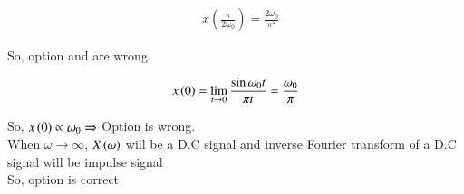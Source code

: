 \documentclass[beamer]{IEEEtran}
\theoremstyle{remark}
\begin{document}
\begin{align}
& x\left(\frac{\pi}{2 \omega_0}\right) =\frac{2 \omega_0}{\pi^2}
\end{align}

So, option  and  are wrong.

\begin{align}
x\left(0\right)=\lim_{t\to 0}\frac{\sin \omega_0 t}{\pi t}=\frac{\omega_0}{\pi}
\end{align}

So, $x\left(0\right) \propto \omega_0 \Rightarrow$ Option  is wrong.\\

When $\omega \rightarrow \infty$, $X\left(\omega\right)$ will be a D.C signal and inverse Fourier transform of a D.C signal will be impulse signal\\[3ex]
So, option  is correct
\end{document}
